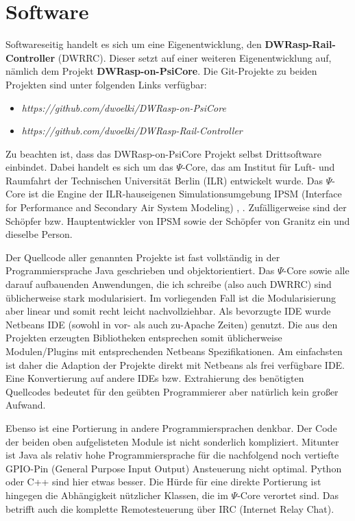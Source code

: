 \section{Software}
\label{sec:software}

Softwareseitig handelt es sich um eine Eigenentwicklung, den \textbf{DWRasp-Rail-Controller} (DWRRC).
Dieser setzt auf einer weiteren Eigenentwicklung auf, n\"amlich dem Projekt \textbf{DWRasp-on-PsiCore}.
Die Git-Projekte zu beiden Projekten sind unter folgenden Links verf\"ugbar:
\begin{itemize}
	\item \textit{https://github.com/dwoelki/DWRasp-on-PsiCore}
	\item \textit{https://github.com/dwoelki/DWRasp-Rail-Controller}
\end{itemize}
Zu beachten ist, dass das DWRasp-on-PsiCore Projekt selbst Drittsoftware einbindet.
Dabei handelt es sich um das $\Psi$-Core, das am Institut f\"ur Luft- und Raumfahrt der Technischen Universit\"at Berlin (ILR) entwickelt wurde.
Das $\Psi$-Core ist die Engine der ILR-hauseigenen Simulationsumgebung IPSM (Interface for Performance and Secondary Air System Modeling) \cite{Woe14}, \cite{Woe19c}.
Zuf\"alligerweise sind der Sch\"opfer bzw. Hauptentwickler von IPSM sowie der Sch\"opfer von Granitz ein und dieselbe Person.

Der Quellcode aller genannten Projekte ist fast vollst\"andig in der Programmiersprache Java geschrieben und objektorientiert.
Das $\Psi$-Core sowie alle darauf aufbauenden Anwendungen, die ich schreibe (also auch DWRRC) sind \"ublicherweise stark modularisiert.
Im vorliegenden Fall ist die Modularisierung aber linear und somit recht leicht nachvollziehbar.
Als bevorzugte IDE wurde Netbeans IDE (sowohl in vor- als auch zu-Apache Zeiten) genutzt.
Die aus den Projekten erzeugten Bibliotheken entsprechen somit \"ublicherweise Modulen/Plugins mit entsprechenden Netbeans Spezifikationen.
Am einfachsten ist daher die Adaption der Projekte direkt mit Netbeans als frei verf\"ugbare IDE.
Eine Konvertierung auf andere IDEs bzw. Extrahierung des ben\"otigten Quellcodes bedeutet f\"ur den ge\"ubten Programmierer aber nat\"urlich kein gro{\ss}er Aufwand.

Ebenso ist eine Portierung in andere Programmiersprachen denkbar.
Der Code der beiden oben aufgelisteten Module ist nicht sonderlich kompliziert.
Mitunter ist Java als relativ hohe Programmiersprache f\"ur die nachfolgend noch vertiefte GPIO-Pin (General Purpose Input Output) Ansteuerung nicht optimal.
Python oder C++ sind hier etwas besser.
Die H\"urde f\"ur eine direkte Portierung ist hingegen die Abh\"angigkeit n\"utzlicher Klassen, die im $\Psi$-Core verortet sind.
Das betrifft auch die komplette Remotesteuerung \"uber IRC (Internet Relay Chat).





